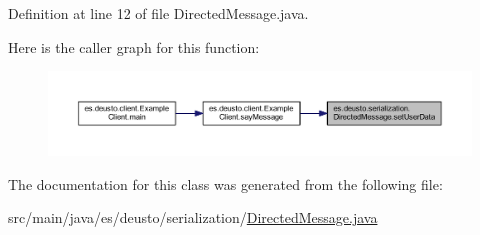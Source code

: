 Definition at line 12 of file Directed\+Message.\+java.

Here is the caller graph for this function\+:
\nopagebreak
\begin{figure}[H]
\begin{center}
\leavevmode
\includegraphics[width=350pt]{classes_1_1deusto_1_1serialization_1_1_directed_message_a4a3f7852410bc29d73179294836e84c4_icgraph}
\end{center}
\end{figure}


The documentation for this class was generated from the following file\+:\begin{DoxyCompactItemize}
\item 
src/main/java/es/deusto/serialization/\mbox{\hyperlink{_directed_message_8java}{Directed\+Message.\+java}}\end{DoxyCompactItemize}
